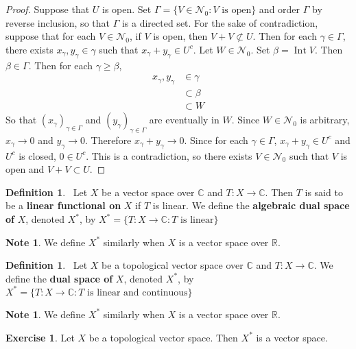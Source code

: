 \documentclass[12pt]{amsart}
\theoremstyle{definition}
\newtheorem{defn}[definition]{Definition}
\newtheorem{note}[definition]{Note}
\newtheorem{ex}[definition]{Exercise}
\newcommand{\gam}{\gamma}
\newcommand{\Gam}{\Gamma}
\newcommand{\be}{\beta}
\newcommand{\C}{\mathbb{C}}
\newcommand{\R}{\mathbb{R}}
\newcommand{\MN}{\mathcal{N}}
\DeclareMathOperator{\Int}{Int}
\newcommand{\ld}[1]{\label{defn:#1}}
\begin{document}
	\begin{proof}
		Suppose that $U$ is open. Set $\Gam = \{V \in \MN_0: V \text{ is open}\}$ and order $\Gam$ by reverse inclusion, so that $\Gam$ is a directed set. For the sake of contradiction, suppose that for each $V \in \MN_0$, if $V$ is open, then $V + V \not \subset U$. Then for each $\gam \in \Gam$, there exists $x_{\gam}, y_{\gam} \in \gam$ such that $x_{\gam}+y_{\gam} \in U^c$. Let $W \in \MN_0$. Set $\be = \Int V$. Then $\be \in \Gam$. Then for each $\gam \geq \be$, 
		\begin{align*}
			x_{\gam},y_{\gam} 
			& \in \gam \\
			& \subset \be \\
			& \subset W
		\end{align*}
		So that $(x_{\gam})_{\gam \in \Gam}$ and $(y_{\gam})_{\gam \in \Gam}$ are eventually in $W$. Since $W \in \MN_0$ is arbitrary, $x_{\gam} \rightarrow 0$ and	$y_{\gam} \rightarrow 0$. Therefore $x_{\gam} + y_{\gam} \rightarrow 0$. Since for each $\gam \in \Gam$, $x_{\gam} + y_{\gam} \in U^c$ and $U^c$ is closed, $0 \in U^c$. This is a contradiction, so there exists $V \in \MN_0$ such that $V$ is open and $V+V \subset U$.
		\end{proof}
	

	\begin{defn} \ld{55001}\
		Let $X$ be a vector space over $\C$ and $T :X \rightarrow \C$. Then $T$ is said to be a \textbf{linear functional on} $X$ if $T$ is linear. We define the \textbf{algebraic dual space of} $X$, denoted $X^*$, by $ X^* = \{ T:X \rightarrow \C: T \text{ is linear} \} $
	\end{defn}
	
	\begin{note}
		We define $X^*$ similarly when $X$ is a vector space  over $\R$.
	\end{note}
	
	\begin{defn} \ld{55001}\
		Let $X$ be a topological vector space over $\C$ and $T :X \rightarrow \C$. We define the \textbf{dual space of} $X$, denoted $X^*$, by $ X^* = \{ T:X \rightarrow \C: T \text{ is linear and continuous} \} $
	\end{defn}
	
	\begin{note}
		We define $X^*$ similarly when $X$ is a vector space  over $\R$.
	\end{note}

	\begin{ex}
		Let $X$ be a topological vector space. Then $X^*$ is a vector space. 
	\end{ex}
\end{document}

